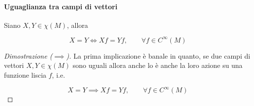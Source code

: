 \paragraph{Uguaglianza tra campi di vettori}

\begin{theorem}
	Siano $ X,Y \in \chi(M) $, allora
	
	\begin{equation}
		X = Y \iff X f = Y f, \qquad \forall f \in C^{\infty}(M)
	\end{equation}
\end{theorem}

\begin{proof}[Dimostrazione ($ \implies $)]
	La prima implicazione è banale in quanto, se due campi di vettori $ X,Y \in \chi(M) $ sono uguali allora anche lo è anche la loro azione su una funzione liscia $ f $, i.e.
	
	\begin{equation}
		X = Y \implies X f = Y f, \qquad \forall f \in C^{\infty}(M)
	\end{equation}
\end{proof}

